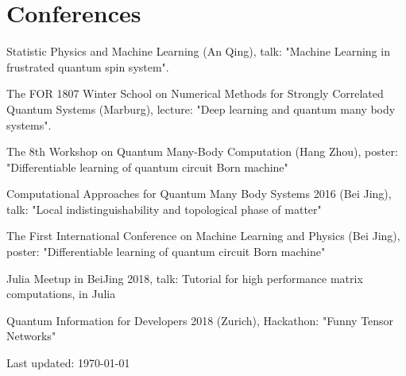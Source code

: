 \documentclass[letterpaper]{article}
\def\footerlink{}   %
\renewenvironment{itemize}{
  \begin{list}{}{
    \setlength{\leftmargin}{1.5em}
  }
}{
  \end{list}
}
\begin{document}
\section*{Conferences}
\begin{itemize}
    \item [1] Statistic Physics and Machine Learning (An Qing), talk: "Machine Learning in frustrated quantum spin system".
    \item [2] The FOR 1807 Winter School on Numerical Methods for Strongly Correlated Quantum Systems (Marburg), lecture: "Deep learning and quantum many body systems".
    \item [3] The 8th Workshop on Quantum Many-Body Computation (Hang Zhou), poster: "Differentiable learning of quantum circuit Born machine"
    \item [4] Computational Approaches for Quantum Many Body Systems 2016 (Bei Jing), talk: "Local indistinguishability and topological phase of matter"
    \item [5] The First International Conference on Machine Learning and Physics (Bei Jing), poster: "Differentiable learning of quantum circuit Born machine"
    \item [6] Julia Meetup in BeiJing 2018, talk: Tutorial for high performance matrix computations, in Julia
    \item [7] Quantum Information for Developers 2018 (Zurich), Hackathon: "Funny Tensor Networks"
\end{itemize}

\bigskip

\begin{center}
  \begin{footnotesize}
    Last updated: \today \\
    \href{\footerlink}{\texttt{\footerlink}}
  \end{footnotesize}
\end{center}
\end{document}
